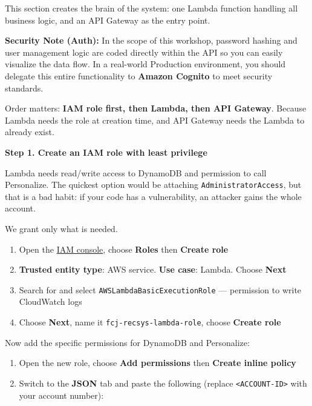 This section creates the brain of the system: one Lambda function
handling all business logic, and an API Gateway as the entry point.

\textbf{Security Note (Auth):} In the scope of this workshop, password
hashing and user management logic are coded directly within the API so
you can easily visualize the data flow. In a real-world Production
environment, you should delegate this entire functionality to
\textbf{Amazon Cognito} to meet security standards.

Order matters: \textbf{IAM role first, then Lambda, then API Gateway}.
Because Lambda needs the role at creation time, and API Gateway needs
the Lambda to already exist.

\vspace{0.5em}\noindent\textbf{Step 1. Create an IAM role with least
privilege}\par

Lambda needs read/write access to DynamoDB and permission to call
Personalize. The quickest option would be attaching
\texttt{AdministratorAccess}, but that is a bad habit: if your code has
a vulnerability, an attacker gains the whole account.

We grant only what is needed.

\begin{enumerate}
\def\labelenumi{\arabic{enumi}.}
\tightlist
\item
  Open the \href{https://console.aws.amazon.com/iam/home\#/roles}{IAM
  console}, choose \textbf{Roles} then \textbf{Create role}
\item
  \textbf{Trusted entity type}: AWS service. \textbf{Use case}: Lambda.
  Choose \textbf{Next}
\item
  Search for and select \texttt{AWSLambdaBasicExecutionRole} ---
  permission to write CloudWatch logs
\item
  Choose \textbf{Next}, name it \texttt{fcj-recsys-lambda-role}, choose
  \textbf{Create role}
\end{enumerate}

Now add the specific permissions for DynamoDB and Personalize:

\begin{enumerate}
\def\labelenumi{\arabic{enumi}.}
\setcounter{enumi}{4}
\tightlist
\item
  Open the new role, choose \textbf{Add permissions} then \textbf{Create
  inline policy}
\item
  Switch to the \textbf{JSON} tab and paste the following (replace
  \texttt{\textless{}ACCOUNT-ID\textgreater{}} with your account
  number):
\end{enumerate}

